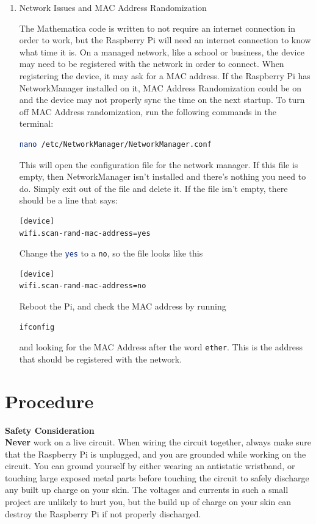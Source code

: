\documentclass[titlepage]{article}
\begin{document}
\begin{enumerate}
    \item Network Issues and MAC Address Randomization \par
    The Mathematica code is written to not require an internet connection in order to work, but the Raspberry Pi will need an internet connection to know what time it is. On a managed network, like a school or business, the device may need to be registered with the network in order to connect. When registering the device, it may ask for a MAC address. If the Raspberry Pi has NetworkManager installed on it, MAC Address Randomization could be on and the device may not properly sync the time on the next startup. To turn off MAC Address randomization, run the following commands in the terminal:
    \begin{lstlisting}[language=bash]
nano /etc/NetworkManager/NetworkManager.conf    \end{lstlisting}
    This will open the configuration file for the network manager. If this file is empty, then NetworkManager isn't installed and there's nothing you need to do. Simply exit out of the file and delete it. If the file isn't empty, there should be a line that says:
    \begin{lstlisting}[language=bash]
[device]
wifi.scan-rand-mac-address=yes \end{lstlisting}
    Change the \lstinline[language=bash]{yes} to a \lstinline[language=bash]{no}, so the file looks like this
    \begin{lstlisting}[language=bash]
[device]
wifi.scan-rand-mac-address=no \end{lstlisting}
    Reboot the Pi, and check the MAC address by running
    \begin{lstlisting}[language=bash]
ifconfig   \end{lstlisting}
    and looking for the MAC Address after the word \lstinline[language=bash]{ether}. This is the address that should be registered with the network.
\end{enumerate}
\section*{Procedure}
\LARGE{\textbf{Safety Consideration}} \\
\normalsize
\textbf{Never} work on a live circuit. When wiring the circuit together, always make sure that the Raspberry Pi is unplugged, and you are grounded while working on the circuit. You can ground yourself by either wearing an antistatic wristband, or touching large exposed metal parts before touching the circuit to safely discharge any built up charge on your skin. The voltages and currents in such a small project are unlikely to hurt you, but the build up of charge on your skin can destroy the Raspberry Pi if not properly discharged. 
\end{document}
